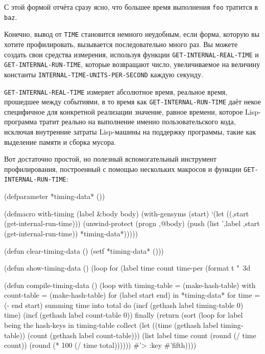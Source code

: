 С этой формой отчёта сразу ясно, что большее время выполнения \lstinline{foo} тратится в
\lstinline{baz}.

Конечно, вывод от \lstinline{TIME} становится немного неудобным, если форма, которую вы хотите
профилировать, вызывается последовательно много раз. Вы можете создать свои средства
измерения, используя функции \lstinline{GET-INTERNAL-REAL-TIME} и \lstinline{GET-INTERNAL-RUN-TIME},
которые возвращают число, увеличиваемое на величину константы
\lstinline{INTERNAL-TIME-UNITS-PER-SECOND} каждую секунду.

\lstinline{GET-INTERNAL-REAL-TIME} измеряет абсолютное время, реальное время, прошедшее между
событиями, в то время как \lstinline{GET-INTERNAL-RUN-TIME} даёт некое специфичное для
конкретной реализации значение, равное времени, которое Lisp-программа тратит реально на
выполнение именно пользовательского кода, исключая внутренние затраты Lisp-машины на
поддержку программы, такие как выделение памяти и сборка мусора.

Вот достаточно простой, но полезный вспомогательный инструмент профилирования, построенный
с помощью нескольких макросов и функции \lstinline{GET-INTERNAL-RUN-TIME}:

\begin{myverb}
(defparameter *timing-data* ())

(defmacro with-timing (label &body body)
  (with-gensyms (start)
    `(let ((,start (get-internal-run-time)))
      (unwind-protect (progn ,@body)
        (push (list ',label ,start (get-internal-run-time)) *timing-data*)))))

(defun clear-timing-data ()
  (setf *timing-data* ()))

(defun show-timing-data ()
  (loop for (label time count time-per %
       (format t "~3d%

(defun compile-timing-data () 
  (loop with timing-table = (make-hash-table)
     with count-table = (make-hash-table)
     for (label start end) in *timing-data*
     for time = (- end start)
     summing time into total
     do
       (incf (gethash label timing-table 0) time)
       (incf (gethash label count-table 0))
     finally 
       (return
         (sort
          (loop for label being the hash-keys in timing-table collect
               (let  ((time (gethash label timing-table))
                      (count (gethash label count-table)))
                 (list label time count (round (/ time count)) (round (* 100 (/ time total))))))
          #'> :key #'fifth))))
\end{myverb}

